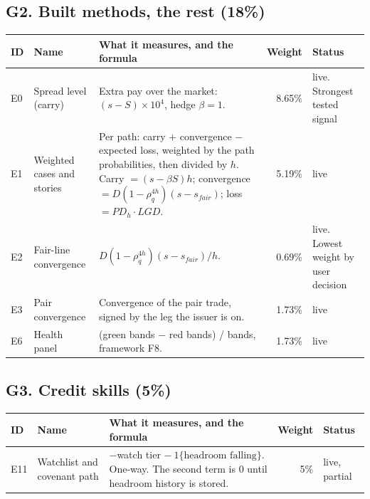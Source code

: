 \documentclass[10pt,a4paper]{article}
\newcommand{\live}{\textcolor{good}{live}}
\begin{document}
\subsection*{G2. Built methods, the rest (18\%)}
\begin{longtable}{lP{3.2cm}P{6.6cm}rP{2.4cm}}
\toprule
ID & Name & What it measures, and the formula & Weight & Status \\\midrule\endhead
E0 & Spread level (carry) & Extra pay over the market: $(s - S)\times 10^4$, hedge $\beta = 1$. & 8.65\% & \live. Strongest tested signal \\
E1 & Weighted cases and stories & Per path: carry $+$ convergence $-$ expected loss, weighted by the path probabilities, then divided by $h$. Carry $=(s - \beta S)h$; convergence $= D(1-\rho_q^{4h})(s - s_{fair})$; loss $= PD_h\cdot LGD$. & 5.19\% & \live \\
E2 & Fair-line convergence & $D(1-\rho_q^{4h})(s - s_{fair})/h$. & 0.69\% & \live. Lowest weight by user decision \\
E3 & Pair convergence & Convergence of the pair trade, signed by the leg the issuer is on. & 1.73\% & \live \\
E6 & Health panel & (green bands $-$ red bands) / bands, framework F8. & 1.73\% & \live \\
\bottomrule
\end{longtable}

\subsection*{G3. Credit skills (5\%)}
\begin{longtable}{lP{3.2cm}P{6.6cm}rP{2.4cm}}
\toprule
ID & Name & What it measures, and the formula & Weight & Status \\\midrule\endhead
E11 & Watchlist and covenant path & $-$watch tier $-\ 1\{\text{headroom falling}\}$. One-way. The second term is 0 until headroom history is stored. & 5\% & \live, partial \\
\bottomrule
\end{longtable}
\end{document}
